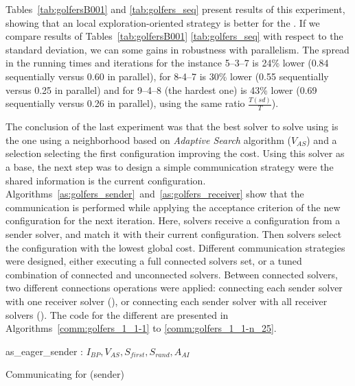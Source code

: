 Tables~\ref{tab:golfersB001} and \ref{tab:golfers_seq} present results of this experiment, showing that an local exploration-oriented strategy is better for the \SGP. If we compare results of Tables~\ref{tab:golfersB001} \ref{tab:golfers_seq} with respect to the standard deviation, we can some gains in robustness with parallelism. The spread in the running times and iterations for the instance 5--3--7 is 24\% lower (0.84 sequentially versus 0.60 in parallel), for 8-4--7 is 30\% lower (0.55 sequentially versus 0.25 in parallel) and for 9--4--8 (the hardest one) is 43\% lower (0.69 sequentially versus 0.26 in parallel), using the same ratio $\tfrac{T(sd)}{T}$).

\separation

The conclusion of the last experiment was that the best solver to solve \SGP{} using \posl{} is the one using a neighborhood \om{} based on {\it Adaptive Search} algorithm ($V_{AS}$) and a selection \om{} selecting the first configuration improving the cost. Using this solver as a base, the next step was to design a simple communication strategy were the shared information is the current configuration. Algorithms~\ref{as:golfers_sender}~and~\ref{as:golfers_receiver} show that the communication is performed while applying the acceptance criterion of the new configuration for the next iteration. Here, solvers receive a configuration from a sender solver, and match it with their current configuration. Then solvers select the configuration with the lowest global cost. Different communication strategies were designed, either executing a full connected solvers set, or a tuned combination of connected and unconnected solvers. Between connected solvers, two different connections operations were applied: connecting each sender solver with one receiver solver (\oneTone), or connecting each sender solver with all receiver solvers (\oneTn). The code for the different \commstrs{} are presented in Algorithms~\ref{comm:golfers_1_1-1} to \ref{comm:golfers_1_1-n_25}.

\begin{algorithm}
\dontprintsemicolon
\SetNoline
{}
   as\_eager\_sender\;
\algoindent {} : $I_{BP}, V_{AS}, S_{first}, S_{rand}, A_{AI}$ \;
\caption{Communicating \as{} for \SGP{} (sender)}\label{as:golfers_sender}
\end{algorithm}

